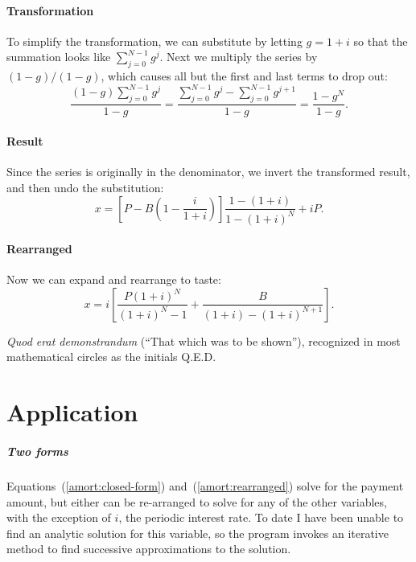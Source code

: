 \paragraph{Transformation}
To simplify the transformation, we can substitute by letting
$g = 1 + i$ so that the summation looks like $\sum_{j=0}^{N-1} g^j$.  
Next we multiply the series by $(1-g)/(1-g)$, which causes all
but the first and last terms to drop out:
\begin{equation}
\frac{(1-g)\displaystyle\sum_{j=0}^{N-1} g^j}{1-g}=
\frac{\displaystyle\sum_{j=0}^{N-1} g^j - \sum_{j=0}^{N-1} g^{j+1}}{1-g}
  = \frac{1 - g^N}{1-g}.
\end{equation}
\paragraph{Result}
Since the series is originally in the denominator, we invert the transformed
result, and then undo the substitution:
\begin{equation}
\label{amort:closed-form}
x = \left[P-B\left(1-\frac{i}{1+i}\right)\right]\frac{1-(1+i)}{1 - (1+i)^N}
 + iP.
\end{equation}
\paragraph{Rearranged}
Now we can expand and rearrange to taste:
\begin{equation}
\label{amort:rearranged}
x = i \left[\frac{P(1+i)^N}{(1+i)^N - 1} 
  + \frac{B}{(1+i) - (1+i)^{N+1}}\right].
\end{equation}


\begin{finalsquare}
\noindent\textit{Quod erat demonstrandum} (``That which was to be
shown''), recognized in most mathematical circles as the initials Q.E.D.
\end{finalsquare}

\section{Application}
\subparagraph{Two forms}
Equations~(\ref{amort:closed-form}) and~(\ref{amort:rearranged})
solve for the payment amount, but either can be re-arranged to solve
for any of the other variables, with the exception of $i$, the
periodic interest rate.  To date I have been unable to find an
analytic solution for this variable, so the program invokes an
iterative method to find successive approximations to the solution.

